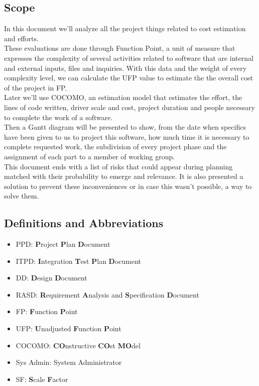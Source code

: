 \subsection{Scope}
In this document we'll analyze all the project things related to cost estimation and efforts.\\
These evaluations are done through Function Point, a unit of measure that expresses the complexity of several activities related to software that are internal and external inputs, files and inquiries. With this data and the weight of every complexity level, we can calculate the UFP value to estimate the the overall cost of the project in FP.\\ 
Later we'll use COCOMO, an estimation model that estimates the effort, the lines of code written, driver scale and cost, project duration and people necessary to complete the work of a software.\\
Then a Gantt diagram will be presented to show, from the date when specifics have been given to us to project this software, how much time it is necessary to complete requested work, the subdivision of every project phase and the assignment of each part to a member of working group.\\
This document ends with a list of risks that could appear during planning matched with their probability to emerge and relevance. It is also presented a solution to prevent these inconveniences or in case this wasn't possible, a way to solve them.
\subsection{Definitions and Abbreviations}
\begin{itemize}
	\item PPD: \textbf{P}roject \textbf{P}lan \textbf{D}ocument
	\item ITPD: \textbf{I}ntegration \textbf{T}est \textbf{P}lan \textbf{D}ocument
	\item DD: \textbf{D}esign \textbf{D}ocument
	\item RASD: \textbf{R}equirement \textbf{A}nalysis and \textbf{S}pecification \textbf{D}ocument
	\item FP: \textbf{F}unction \textbf{P}oint
	\item UFP: \textbf{U}nadjusted \textbf{F}unction \textbf{P}oint
	\item COCOMO: \textbf{CO}nstructive \textbf{CO}st \textbf{MO}del
	\item Sys Admin: System Administrator
	\item SF: \textbf{S}cale \textbf{F}actor
\end{itemize}
